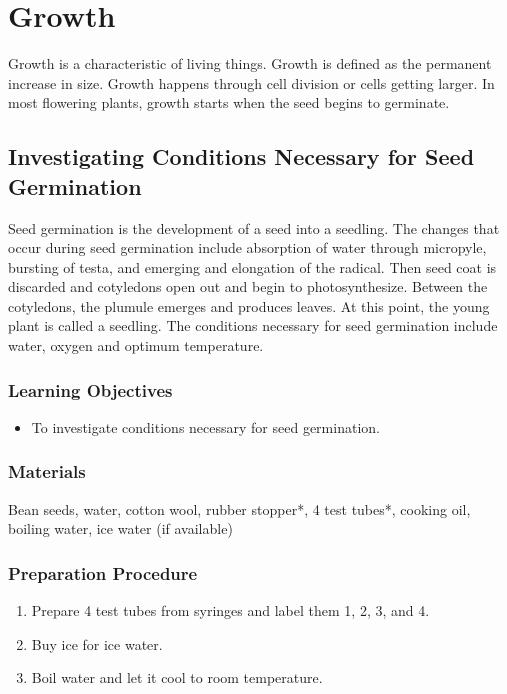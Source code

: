 \section{Growth}
Growth is a characteristic of living things. Growth is defined as the permanent increase in size. Growth happens through cell division or cells getting larger. In most flowering plants, growth starts when the seed begins to germinate.

\subsection{Investigating Conditions Necessary for Seed Germination}
Seed germination is the development of a seed into a seedling. The changes that occur during seed germination include absorption of water through micropyle, bursting of testa, and emerging and elongation of the radical. Then seed coat is discarded and cotyledons open out and begin to photosynthesize. Between the cotyledons, the plumule emerges and produces leaves. At this point, the young plant is called a seedling. The conditions necessary for seed germination include water, oxygen and optimum temperature.

\subsubsection*{Learning Objectives}
\begin{itemize}
\item{To investigate conditions necessary for seed germination.}
\end{itemize}

\subsubsection*{Materials}
Bean seeds, water, cotton wool, rubber stopper*, 4 test tubes*, cooking oil, boiling water, ice water (if available)

\subsubsection*{Preparation Procedure}
\begin{enumerate}
\item{Prepare 4 test tubes from syringes and label them 1, 2, 3, and 4.}
\item{Buy ice for ice water.}
\item{Boil water and let it cool to room temperature.}
\end{enumerate}

